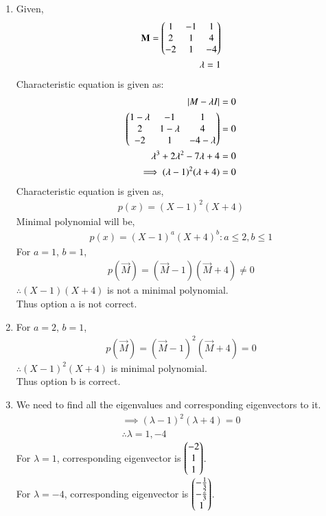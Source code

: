 \begin{enumerate}
\item{Given,
\begin{align}
\mathbf{M}=\begin{pmatrix}1&-1&1\\2&1&4\\-2&1&-4\end{pmatrix}\\
\lambda=1
\end{align}
Characteristic equation is given as:
\begin{align}
\lvert M-\lambda I \rvert =0\\
\begin{pmatrix}1-\lambda&-1 &1\\2&1-\lambda&4\\-2&1&-4-\lambda\end{pmatrix}=0\\
\lambda^3+2\lambda^2-7\lambda+4=0\\
\implies (\lambda-1)^2(\lambda+4)=0
\end{align}
Characteristic equation is given as,
\begin{align}
p(x)=(X-1)^2(X+4)
\end{align}
Minimal polynomial will be,
\begin{align}
p(x)=(X-1)^a(X+4)^b : a \leq 2, b \leq 1
\end{align}
For $a=1$, $b=1$,
\begin{align}
p(\vec{M})=(\vec{M}-1)(\vec{M}+4)\neq0
\end{align}
$\therefore (X-1)(X+4)$ is not a minimal polynomial.\\
Thus option a is not correct.\\}
\item{For $a=2$, $b=1$,
\begin{align}
p(\vec{M})=(\vec{M}-1)^2(\vec{M}+4)=0
\end{align}
$\therefore (X-1)^2(X+4)$ is minimal polynomial.\\
Thus option b is correct.}\\
\item{ We need to find all the eigenvalues and corresponding eigenvectors to it.
\begin{align}
\implies (\lambda-1)^2(\lambda+4)=0\\
\therefore \lambda=1 , -4
\end{align}
 For $\lambda=1$, corresponding eigenvector is $\begin{pmatrix}-2\\1\\1\end{pmatrix}$.\\
For $\lambda=-4$, corresponding eigenvector is $\begin{pmatrix}-\frac{1}{3}\\-\frac{2}{3}\\1\end{pmatrix}$.\\
}
\end{enumerate}
